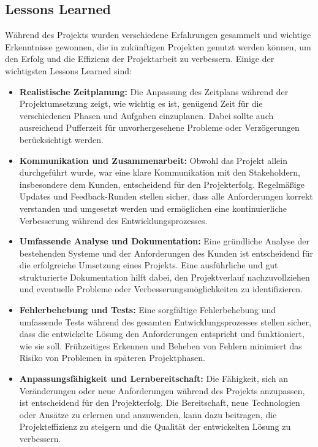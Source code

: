 \begin{flushleft}
	\subsection{Lessons Learned} Während des Projekts wurden verschiedene Erfahrungen gesammelt und wichtige Erkenntnisse gewonnen, die in zukünftigen Projekten genutzt werden können, um den Erfolg und die Effizienz der Projektarbeit zu verbessern. Einige der wichtigsten Lessons Learned sind:

	\begin{itemize} \item \textbf{Realistische Zeitplanung:} Die Anpassung des Zeitplans während der Projektumsetzung zeigt, wie wichtig es ist, genügend Zeit für die verschiedenen Phasen und Aufgaben einzuplanen. Dabei sollte auch ausreichend Pufferzeit für unvorhergesehene Probleme oder Verzögerungen berücksichtigt werden.

	\item \textbf{Kommunikation und Zusammenarbeit:} Obwohl das Projekt allein durchgeführt wurde, war eine klare Kommunikation mit den Stakeholdern, insbesondere dem Kunden, entscheidend für den Projekterfolg. Regelmäßige Updates und Feedback-Runden stellen sicher, dass alle Anforderungen korrekt verstanden und umgesetzt werden und ermöglichen eine kontinuierliche Verbesserung während des Entwicklungsprozesses.

	\item \textbf{Umfassende Analyse und Dokumentation:} Eine gründliche Analyse der bestehenden Systeme und der Anforderungen des Kunden ist entscheidend für die erfolgreiche Umsetzung eines Projekts. Eine ausführliche und gut strukturierte Dokumentation hilft dabei, den Projektverlauf nachzuvollziehen und eventuelle Probleme oder Verbesserungsmöglichkeiten zu identifizieren.

	\item \textbf{Fehlerbehebung und Tests:} Eine sorgfältige Fehlerbehebung und umfassende Tests während des gesamten Entwicklungsprozesses stellen sicher, dass die entwickelte Lösung den Anforderungen entspricht und funktioniert, wie sie soll. Frühzeitiges Erkennen und Beheben von Fehlern minimiert das Risiko von Problemen in späteren Projektphasen.

	\item \textbf{Anpassungsfähigkeit und Lernbereitschaft:} Die Fähigkeit, sich an Veränderungen oder neue Anforderungen während des Projekts anzupassen, ist entscheidend für den Projekterfolg. Die Bereitschaft, neue Technologien oder Ansätze zu erlernen und anzuwenden, kann dazu beitragen, die Projekteffizienz zu steigern und die Qualität der entwickelten Lösung zu verbessern.


\end{itemize}
\end{flushleft}
